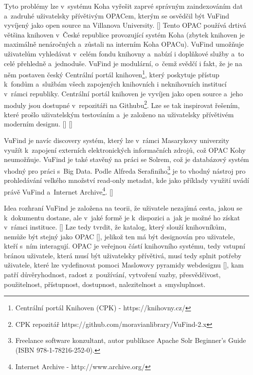 \documentclass[
	11pt, oneside, printed, final, palatino, monochrome
	microtype,
	table,   %
	lof,     %
	lot     %
]{fithesis3}
\newcommand{\citepages}[2]{[\cite[#1]{#2}]}
\newcommand{\citesource}[1]{[\cite{#1}]}
\begin{document}
{Tyto problémy lze v~systému Koha vyřešit zaprvé správným zaindexováním dat a~zadruhé uživatelsky přívětivým OPACem, kterým se osvědčil být VuFind vyvíjený jako open source na Villanova University. \citepages{12}{Coufalova2009} Tento OPAC používá drtivá většina knihoven v~České republice provozující systém Koha (zbytek knihoven je maximálně nenáročných a~zůstali na interním Koha OPACu). VuFind umožňuje uživatelům vyhledávat v~celém fondu knihovny a~nabízí i doplňkové služby a~to celé přehledně a~jednoduše. VuFind je modulární, o~čemž svědčí i fakt, že je na něm postaven český Centrální portál knihoven\footnote{Centrální portál Knihoven (CPK) - https://knihovny.cz/}, který poskytuje přístup k~fondům a~službám všech zapojených knihovních i neknihovních institucí v~rámci republiky. Centrální portál knihoven je vyvíjen jako open source a~jeho moduly jsou dostupné v~repozitáři na Githubu\footnote{CPK repozitář https://github.com/moravianlibrary/VuFind-2.x
}. Lze se tak inspirovat řešením, které prošlo uživatelským testováním a~je založeno na uživatelsky přívětivém moderním designu. \citesource{aktivity_2016}  \citesource{smlouva_o_dilo_2015}

VuFind je navíc discovery systém, který lze v~rámci Masarykovy univerzity využít k~zapojení externích elektronických informačních zdrojů, což OPAC Kohy neumožňuje. VuFind je také stavěný na práci se Solrem, což je databázový systém vhodný pro práci s~Big Data. Podle Alfreda Serafiniho\footnote{Freelance software konzultant, autor publikace Apache Solr Beginner's Guide (ISBN 978-1-78216-252-0).} je to vhodný nástroj pro prohledávání velkého množství read-only metadat, kde jako příklady využití uvádí právě VuFind a~Internet Archive\footnote{Internet Archive - http://www.archive.org/}. \citepages{20}{68071520130101}

Idea rozhraní VuFind je založena na teorii, že uživatele nezajímá cesta, jakou se k~dokumentu dostane, ale v~jaké formě je k~dispozici a~jak je možné ho získat v~rámci instituce. \citepages{20}{Coufalova2009} Lze tedy tvrdit, že katalog, který slouží knihovníkům, nemůže být stejný jako OPAC \citepages{5}{Schmidt2012}, jelikož ten má být designován pro uživatele, kteří s~ním interagují. OPAC je veřejnou částí knihovního systému, tedy vstupní bránou uživatele, která musí být uživatelsky přívětivá, musí tedy splnit potřeby uživatele, které lze vydefinovat pomoci Maslowovy pyramidy webdesignu \citepages{156-179}{rezac_2014}, kam patří důvěryhodnost, radost z~používání, vytvoření vazby, přesvědčivost, použitelnost, přístupnost, dostupnost, nalezitelnost a~smysluplnost. 

}
\end{document}
